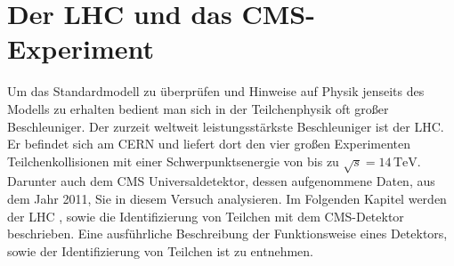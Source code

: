 \section{Der LHC und das CMS-Experiment}
\label{lhccms_chapter}
Um das Standardmodell zu \"uberpr\"ufen und Hinweise auf Physik jenseits des Modells zu erhalten bedient man sich in der Teilchenphysik oft gro\ss{}er Beschleuniger. 
Der zurzeit weltweit leistungsst\"arkste Beschleuniger ist der LHC. Er befindet sich am CERN und liefert dort den vier gro\ss{}en Experimenten Teilchenkollisionen mit einer Schwerpunktsenergie von bis zu 
$\sqrt{s} = 14\,\mathrm{TeV}$. Darunter auch dem CMS Universaldetektor, dessen aufgenommene Daten, aus dem Jahr 2011, Sie in diesem Versuch analysieren. 
Im Folgenden Kapitel werden der LHC \cite{LHC}, sowie die Identifizierung von Teilchen mit dem CMS-Detektor beschrieben. Eine ausf\"uhrliche Beschreibung der Funktionsweise eines Detektors, 
sowie der Identifizierung von Teilchen ist \cite{Kleinknecht:1984jt,Grupen:PD} zu entnehmen. 

